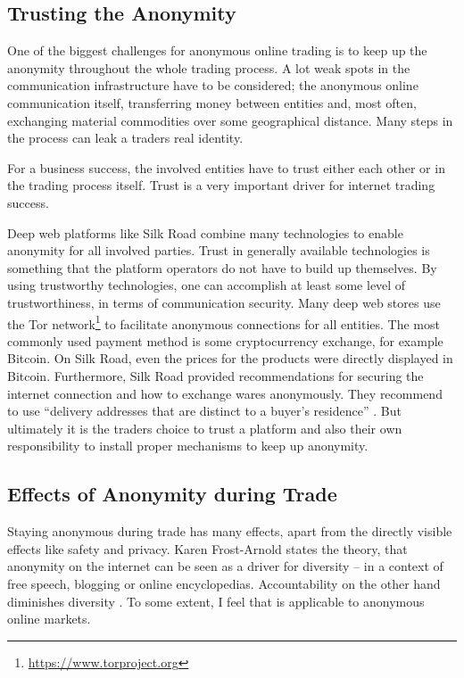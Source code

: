 \subsection{Trusting the Anonymity}

One of the biggest challenges for anonymous online trading is to keep up the anonymity throughout the whole trading process. A lot weak spots in the communication infrastructure have to be considered; the anonymous online communication itself, transferring money between entities and, most often, exchanging material commodities over some geographical distance. Many steps in the process can leak a traders real identity.

For a business success, the involved entities have to trust either each other or in the trading process itself. Trust is a very important driver for internet trading success\cite{internetTrust2004}.

Deep web platforms like Silk Road\cite{silkroad2013} combine many technologies to enable anonymity for all involved parties. Trust in generally available technologies is something that the platform operators do not have to build up themselves. By using trustworthy technologies, one can accomplish at least some level of trustworthiness, in terms of communication security. Many deep web stores use the Tor network\footnote{\url{https://www.torproject.org}} to facilitate anonymous connections for all entities\cite{silkroad2013}. The most commonly used payment method is some cryptocurrency exchange, for example Bitcoin. On Silk Road, even the prices for the products were directly displayed in Bitcoin. Furthermore, Silk Road provided recommendations for securing the internet connection and how to exchange wares anonymously. They recommend to use ``delivery addresses that are distinct to a buyer's residence'' \cite{silkroad2013}. But ultimately it is the traders choice to trust a platform and also their own responsibility to install proper mechanisms to keep up anonymity.

\subsection{Effects of Anonymity during Trade}

Staying anonymous during trade has many effects, apart from the directly visible effects like safety and privacy. Karen Frost-Arnold \cite{accountability2014} states the theory, that anonymity on the internet can be seen as a driver for diversity -- in a context of free speech, blogging or online encyclopedias. Accountability on the other hand diminishes diversity \cite{accountability2014}. To some extent, I feel that is applicable to anonymous online markets.

